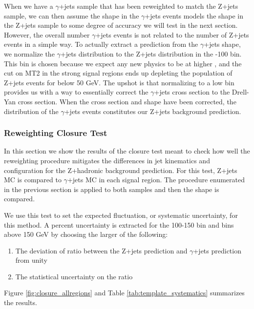     When we have a $\gamma$+jets sample that has been \pt reweighted to match the Z+jets sample, we can then assume the \MET shape in the $\gamma$+jets events models the \MET shape in the Z+jets sample to some degree of accuracy we will test in the next section. However, the overall number $\gamma$+jets events is not related to the number of Z+jets events in a simple way. To actually extract a prediction from the $\gamma$+jets \MET shape, we normalize the $\gamma$+jets \MET distribution to the Z+jets distribution in the -100 bin. This bin is chosen because we expect any new physics to be at higher \MET, and the cut on MT2 in the strong signal regions ends up depleting the population of Z+jets events for \MET below 50 GeV. The upshot is that normalizing to a low \MET bin provides us with a way to essentially correct the $\gamma$+jets cross section to the Drell-Yan cross section. When the cross section and \pt shape have been corrected, the \MET distribution of the $\gamma$+jets events constitutes our Z+jets background prediction.


    \subsubsection{\pt Reweighting Closure Test} \label{sec:pt_reweighting_closure_test}
      In this section we show the results of the closure test meant to check how well the \pt reweighting procedure mitigates the differences in jet kinematics and configuration for the Z+hadronic background prediction. For this test, Z+jets MC is compared to $\gamma$+jets MC in each signal region. The procedure enumerated in the previous section is applied to both samples and then the \MET shape is compared. 

      We use this test to set the expected fluctuation, or systematic uncertainty, for this method. A percent uncertainty is extracted for the 100-150 \MET bin and bins above 150 GeV by choosing the larger of the following:

      \begin{enumerate}
        \item The deviation of ratio between the Z+jets prediction and $\gamma$+jets prediction from unity

        \item The statistical uncertainty on the ratio
      \end{enumerate}     

      Figure \ref{fig:closure_allregions} and Table \ref{tab:template_systematics} summarizes the results.

